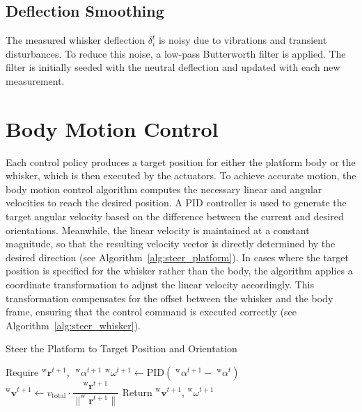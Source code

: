 \subsection{Deflection Smoothing}

The measured whisker deflection \(\delta_{i}^{t}\) is noisy due to vibrations and transient disturbances.
To reduce this noise, a low-pass Butterworth filter is applied.
The filter is initially seeded with the neutral deflection and updated with each new measurement.

\section{Body Motion Control}

Each control policy produces a target position for either the platform body or the whisker, which is then executed by the actuators.
To achieve accurate motion, the body motion control algorithm computes the necessary linear and angular velocities to reach the desired position.
A PID controller is used to generate the target angular velocity based on the difference between the current and desired orientations.
Meanwhile, the linear velocity is maintained at a constant magnitude, so that the resulting velocity vector is directly determined by the desired direction (see Algorithm~\ref{alg:steer_platform}).
In cases where the target position is specified for the whisker rather than the body, the algorithm applies a coordinate transformation to adjust the linear velocity accordingly.
This transformation compensates for the offset between the whisker and the body frame, ensuring that the control command is executed correctly (see Algorithm~\ref{alg:steer_whisker}).


\begin{algorithm}[htb]
    \caption{Steer the Platform to Target Position and Orientation}
    \begin{algorithmic}[1]
        \State Require \(^{\mathrm{w}}\boldsymbol{r}^{t+1}\), \(\;^{\mathrm{w}}\alpha^{t+1}\)
        \State \(^{\mathrm{w}}\omega^{t+1} \gets \mathrm{PID}(\;^{\mathrm{w}}\alpha^{t+1} - \;^{\mathrm{w}}\alpha^{t})\)
        \State \(^{\mathrm{w}}\boldsymbol{v}^{t+1} \gets v_{\mathrm{total}} \cdot \dfrac{^{\mathrm{w}}\boldsymbol{r}^{t+1}}{\|^{\mathrm{w}}\boldsymbol{r}^{t+1}\|}\)
        \State Return \(^{\mathrm{w}}\boldsymbol{v}^{t+1}\), \(^{\mathrm{w}}\omega^{t+1}\)
    \end{algorithmic}
    \label{alg:steer_platform}
\end{algorithm}

